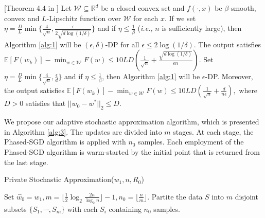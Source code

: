 \documentclass[12pt]{alt2022} %
\begin{document}
		\begin{lemma}\label{lemma:4}[Theorem 4.4 in \citep{feldman2020private}]
		Let $\mathcal{W}\subseteq \mathbb{R}^d$ be a closed convex set and $f(\cdot, x)$ be $\beta$-smooth, convex and $L$-Lipschitz function over $\mathcal{W}$ for each $x$. If we set $\eta=\frac{D}{L}\min\{\frac{4}{\sqrt{n}}, \frac{\epsilon}{2\sqrt{d\log(1/\delta)}}\}$ and if $\eta\leq \frac{1}{\beta}$ ({\em i.e.,} $n$ is sufficiently large), then Algorithm \ref{alg:1} will be $(\epsilon,\delta)$-DP for all $\epsilon\leq 2\log (1/\delta)$. The output satisfies
	$\mathbb{E}[F(w_k)]-\min_{w\in \mathcal{W}}F(w) \leq 10LD\left(\frac{1}{\sqrt{n}}+\frac{\sqrt{d\log(1/\delta)}}{\epsilon n}\right).$
	Set $\eta=\frac{D}{L}\min\{\frac{4}{\sqrt{n}}, \frac{\epsilon}{d}\}$ and if $\eta\leq \frac{1}{\beta}$, then Algorithm \ref{alg:1} will be $\epsilon$-DP. Moreover, the output satisfies $
	\mathbb{E}[F(w_k)]-\min_{w\in \mathcal{W}}F(w) \leq 10LD\left(\frac{1}{\sqrt{n}}+\frac{d}{n\epsilon}\right), 
	$
	where  $D>0$ satisfies that $||w_0-w^*||_2\leq D$. 
	\end{lemma} 
	We propose our adaptive stochastic approximation algorithm, which is presented in Algorithm \ref{alg:3}. The updates are divided into $m$ stages. At each stage, the Phased-SGD algorithm is applied with $n_0$ samples. Each employment of the Phased-SGD algorithm is warm-started by the initial point that is returned from the last stage. 
		\begin{algorithm}
	\caption{Private Stochastic Approximation($w_1,n,R_0$) \label{alg:3}}
	   	Set $\hat{w}_0=w_1, m=\lfloor \frac{1}{2}\log_2\frac{2n}{\log_2 n}\rfloor -1, n_0=\lfloor\frac{n}{m}\rfloor$. Partite the data $S$ into $m$ disjoint subsets $\{S_1, \cdots, S_m\}$ with each $S_i$ containing $n_0$ samples. \;
	    
\end{algorithm}
\end{document}
